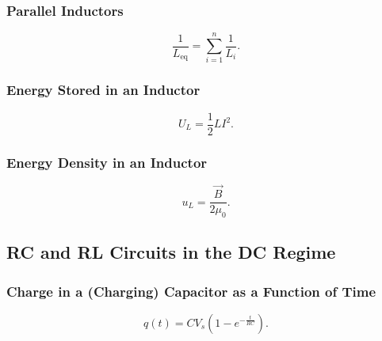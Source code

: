 \begin{symbols}
\end{symbols}

\subsubsection{Parallel Inductors}
\begin{equation*}
  \frac{1}{L_{\mathrm{eq}}} = \sum_{i = 1}^{n} \frac{1}{L_i}
.\end{equation*}

\begin{symbols}
\end{symbols}

\subsubsection{Energy Stored in an Inductor}
\begin{equation*}
  U_L = \frac{1}{2} L I^2
.\end{equation*}
\begin{symbols}
\end{symbols}

\subsubsection{Energy Density in an Inductor}
\begin{equation*}
  u_L = \frac{\Vec{B}}{2 \mu_0}
.\end{equation*}

\begin{symbols}
\end{symbols}

\subsection{RC and RL Circuits in the DC Regime}

\subsubsection{Charge in a (Charging) Capacitor as a Function of Time}
\begin{equation*}
  q(t) = C V_s \left( 1 - e^{- \frac{t}{RC}} \right)
.\end{equation*}

